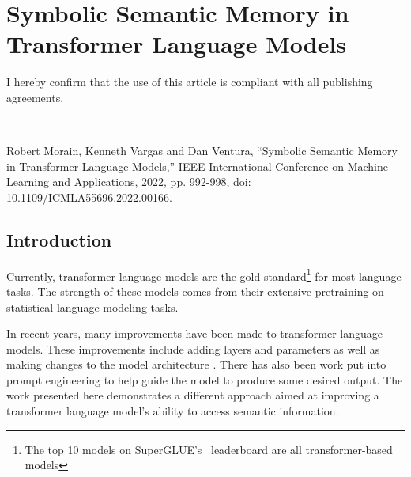 \documentclass[phd,electronic,oneside,twosidetoc,letterpaper,chaptercenter,parttop,lof]{byumsphd}
\begin{document}
\chapter{Symbolic Semantic Memory in Transformer Language Models} 
\label{chap:ssm}

I hereby confirm that the use of this article is compliant with all publishing agreements.

\

\noindent
Robert Morain, Kenneth Vargas and Dan Ventura, ``Symbolic Semantic Memory in Transformer Language Models,'' IEEE International Conference on Machine Learning and Applications, 2022, pp. 992-998, doi: 10.1109/ICMLA55696.2022.00166. 


\newcommand{\LMLossPercentageDecrease}{81.04\%}


\begin{abstract}
This paper demonstrates how transformer language models can be improved by giving them access to relevant structured data extracted from a knowledge base. 
The methods for doing so include identifying entities in a text corpus, sorting the entities using a novel attention-based approach, linking entities to a knowledge base, then extracting and filtering the knowledge to create a knowledge-augmented dataset.
We evaluate these methods with the WikiText-103 corpus using standard language modeling objectives.
These results show that even simple additional knowledge augmentation leads to a reduction in validation perplexity by \LMLossPercentageDecrease. 
These methods also significantly outperform common ways of improving language models such as increasing the model size or adding more data.
\end{abstract}


\section{Introduction}
Currently, transformer language models are the gold standard\footnote{The top 10 models on SuperGLUE's~\cite{wang2019superglue} leaderboard are all transformer-based models} for most language tasks.
The strength of these models comes from their extensive pretraining on statistical language modeling tasks.

In recent years, many improvements have been made to transformer language models.
These improvements include adding layers and parameters \cite{brown2020language} as well as making changes to the model architecture \cite{devlin2018bert}.
There has also been work put into prompt engineering \cite{zhang2021differentiable} to help guide the model to produce some desired output.
The work presented here demonstrates a different approach aimed at improving a transformer language model's ability to access semantic information.
\end{document}
